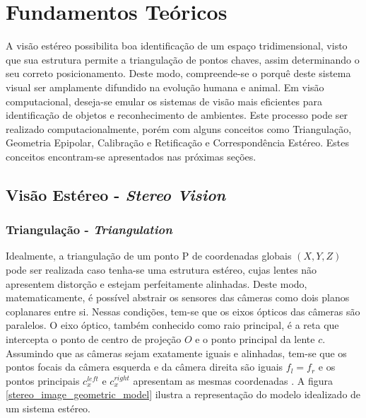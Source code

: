 \chapter{Fundamentos Teóricos}
\label{Revisão Bibliográfica}

A visão estéreo possibilita boa identificação de um espaço tridimensional, visto que sua estrutura permite a triangulação de pontos chaves, assim determinando o seu correto posicionamento. Deste modo, compreende-se o porquê deste sistema visual ser amplamente difundido na evolução humana e animal. Em visão computacional, deseja-se emular os sistemas de visão mais eficientes para identificação de objetos e reconhecimento de ambientes. Este processo pode ser realizado  computacionalmente, porém com alguns conceitos como Triangulação, Geometria Epipolar, Calibração e Retificação e Correspondência Estéreo. Estes conceitos encontram-se apresentados nas próximas seções.


\section{Visão Estéreo - \textit{Stereo Vision}}
\subsection{Triangulação - \textit{Triangulation}}

Idealmente, a triangulação de um ponto P de coordenadas globais $(X,Y,Z)$ pode ser realizada caso tenha-se uma estrutura estéreo, cujas lentes não apresentem distorção e estejam perfeitamente alinhadas. Deste modo, matematicamente, é possível abstrair os sensores das câmeras como dois planos coplanares entre si. Nessas condições, tem-se que os eixos ópticos das câmeras são paralelos. O eixo óptico, também conhecido como raio principal, é a reta que intercepta o ponto de centro de projeção ${O}$ e o ponto principal da lente ${c}$. Assumindo que as câmeras sejam exatamente iguais e alinhadas, tem-se que os pontos focais da câmera esquerda e da câmera direita são iguais ${f_l = f_r}$ e os pontos principais ${c^{left}_x}$ e  ${c^{right}_x}$ apresentam as mesmas coordenadas \cite{Bradski2008}. A figura \ref{stereo_image_geometric_model} ilustra a representação do modelo idealizado de um sistema estéreo.

